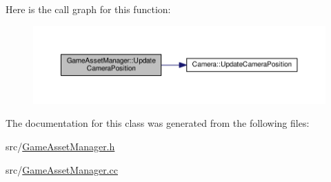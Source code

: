 Here is the call graph for this function\+:\nopagebreak
\begin{figure}[H]
\begin{center}
\leavevmode
\includegraphics[width=350pt]{class_game_asset_manager_afbcf9d370cfefc67a696395f2cdf1a9b_cgraph}
\end{center}
\end{figure}




The documentation for this class was generated from the following files\+:\begin{DoxyCompactItemize}
\item 
src/\hyperlink{_game_asset_manager_8h}{Game\+Asset\+Manager.\+h}\item 
src/\hyperlink{_game_asset_manager_8cc}{Game\+Asset\+Manager.\+cc}\end{DoxyCompactItemize}
